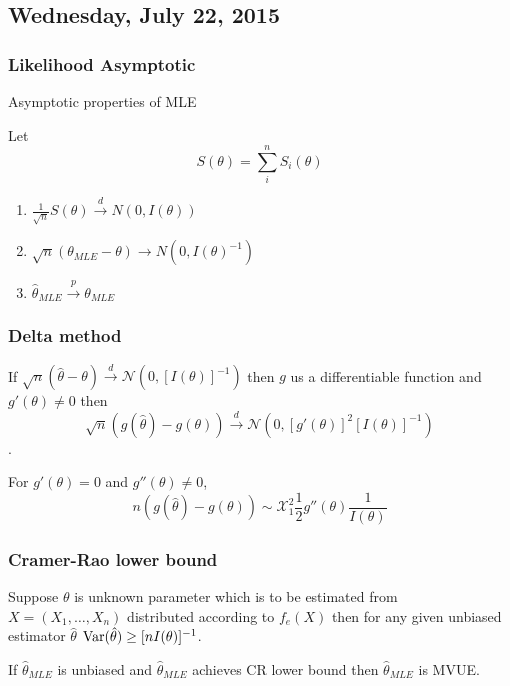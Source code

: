 \subsection{Wednesday, July 22, 2015}





\subsubsection{Likelihood Asymptotic}

Asymptotic properties of MLE

Let
\[S(\theta)=\sum_i^n S_i(\theta)\]
\begin{enumerate}
\item $\frac{1}{\sqrt{n}}S(\theta) \xrightarrow{d} N(0, I(\theta))$
\item $\sqrt{n}(\theta_{MLE}-\theta)\to N(0,I(\theta)^{-1})$
\item $\hat \theta_{MLE} \xrightarrow{p} \theta_{MLE}$
\end{enumerate}


\subsubsection{Delta method}
If $\sqrt{n}(\hat\theta-\theta)\xrightarrow{d}\mathcal{N}(0, [I(\theta)]^{-1})$
then $g$ us a differentiable function and $g'(\theta)\neq 0$
then 
\[\sqrt{n}(g(\hat\theta)-g(\theta))\xrightarrow{d}\mathcal{N}(0, [g'(\theta)]^2[I(\theta)]^{-1})\].

For $g'(\theta)=0$ and $g''(\theta)\neq 0$,
\[n(g(\hat\theta)-g(\theta)) \sim \mathcal{X}^2_{1}\frac{1}{2}g''(\theta)\frac{1}{I(\theta)}\]




\subsubsection{Cramer-Rao lower bound}

Suppose $\theta$ is unknown parameter which is to be estimated from $X=(X_1,\ldots,X_n)$
distributed according to $f_e(X)$ then for any given unbiased estimator $\hat\theta$
$\mathrm{Var}(\hat\theta)\geq [nI(\theta)]^{-1}$.

If $\hat\theta_{MLE}$ is unbiased and $\hat\theta_{MLE}$ achieves CR lower bound
then $\hat\theta_{MLE}$ is MVUE.


